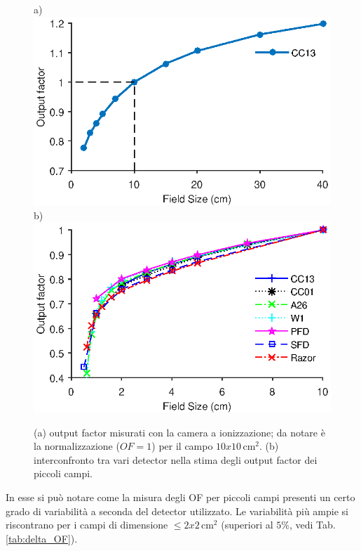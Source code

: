 \begin{figure}[!t]
\centering
a)\includegraphics[width=.8\textwidth]{./cap2/OF_plots/OFCC13.eps}\\
b)\includegraphics[width=.8\textwidth]{./cap2/OF_plots/OFSmall.eps}
\caption{(a) output factor misurati con la camera a ionizzazione; da notare è la normalizzazione ($OF=1$) per il campo $10x10\,$cm$^2$. (b) interconfronto tra vari detector nella stima degli output factor dei piccoli campi.}
\label{fig:OF_res}
\end{figure}
In esse si può notare come la misura degli OF per piccoli campi presenti un certo grado di variabilità a seconda del detector utilizzato. Le variabilità più ampie si riscontrano per i campi di dimensione $\leq 2x2\,$cm$^2$ (superiori al $5\%$, vedi Tab.\ref{tab:delta_OF}). 

